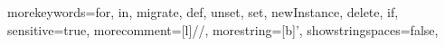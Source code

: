 {morekeywords={for, in, migrate, def, unset, set, newInstance, delete, if},
sensitive=true,
morecomment=[l]{//},
morestring=[b]',
showstringspaces=false,
}